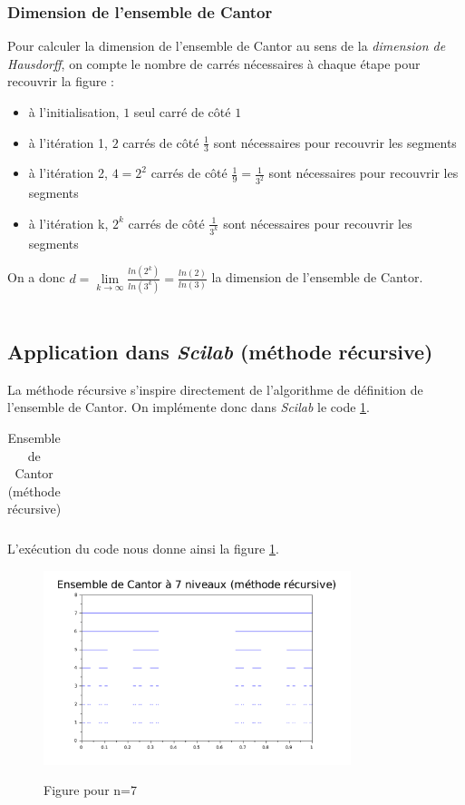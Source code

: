 \documentclass[a4paper,10pt]{report}
\begin{document}
\subsubsection{Dimension de l'ensemble de Cantor}
Pour calculer la dimension de l'ensemble de Cantor au sens de la \textit{dimension de Hausdorff}, on compte le nombre de carrés nécessaires à chaque étape pour recouvrir la figure :
\begin{itemize}
\item à l'initialisation, $1$ seul carré de côté $1$
\item à l'itération 1, $2$ carrés de côté $\frac{1}{3}$ sont nécessaires pour recouvrir les segments
\item à l'itération 2, $4=2^2$ carrés de côté $\frac{1}{9} = \frac{1}{3^2}$ sont nécessaires pour recouvrir les segments
\item à l'itération k, $2^k$ carrés de côté $\frac{1}{3^k}$ sont nécessaires pour recouvrir les segments
\end{itemize}
On a donc $d=\lim\limits_{k \rightarrow \infty} \frac{ln(2^k)}{ln(3^k)}=\frac{ln(2)}{ln(3)}$ la dimension de l'ensemble de Cantor.
\\ \\

\subsection{Application dans \textit{Scilab} (méthode récursive)}
La méthode récursive s'inspire directement de l'algorithme de définition de l'ensemble de Cantor. On implémente donc dans \textit{Scilab} le code \ref{code_cantor}.
\begin{table}[H]
\caption{Ensemble de Cantor (méthode récursive)}
\begin{tabular}{l}
\\
\end{tabular}
\label{code_cantor}
\end{table}
L'exécution du code nous donne ainsi la figure \ref{cantor_recursif}.
\begin{center}
\begin{figure}[H]
\centering
\caption{Figure pour n=7}
\includegraphics[width=0.8\textwidth]{cantor_recursif.pdf}
\label{cantor_recursif}
\end{figure}
\end{center}
\end{document}
